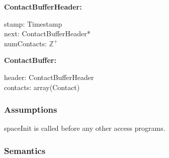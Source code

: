 \documentclass[12pt]{article}
\newcommand{\UZ}{$\mathbb{Z}^+$}
\begin{document}
	\noindent \textbf{ContactBufferHeader:}
	\begin{multicols}{3}
		\noindent stamp: Timestamp \\
		next: ContactBufferHeader* \\
		numContacts: \UZ
	\end{multicols}
	
	\noindent \textbf{ContactBuffer:}
	\begin{multicols}{2}
		\noindent header: ContactBufferHeader \\
		contacts: array(Contact) 
	\end{multicols}
	


\subsubsection{Assumptions} \label{SecASpace}
 spaceInit is called before any other access programs.

\subsubsection{Semantics}  \label{SecAPSSpace}
\end{document}

